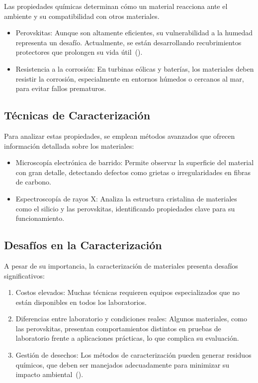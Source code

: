\documentclass[letterpaper, 12pt]{article}
\begin{document}
Las propiedades químicas determinan cómo un material reacciona ante el ambiente
y su compatibilidad con otros materiales.

\begin{itemize}
      \item Perovskitas: Aunque son altamente eficientes, su vulnerabilidad a la humedad
            representa un desafío. Actualmente, se están desarrollando recubrimientos
            protectores que prolongen su vida útil~(\cite{Henriksson2021}).

      \item Resistencia a la corrosión: En turbinas eólicas y baterías, los materiales
            deben resistir la corrosión, especialmente en entornos húmedos o cercanos al
            mar, para evitar fallos prematuros.
\end{itemize}

\subsection{Técnicas de Caracterización}

Para analizar estas propiedades, se emplean métodos avanzados que ofrecen
información detallada sobre los materiales:

\begin{itemize}
      \item Microscopía electrónica de barrido: Permite observar la superficie del material
            con gran detalle, detectando defectos como grietas o irregularidades en fibras
            de carbono.

      \item Espectroscopía de rayos X: Analiza la estructura cristalina de materiales como
            el silicio y las perovskitas, identificando propiedades clave para su
            funcionamiento.
\end{itemize}

\subsection{Desafíos en la Caracterización}

A pesar de su importancia, la caracterización de materiales presenta desafíos
significativos:

\begin{enumerate}
      \item Costos elevados: Muchas técnicas requieren equipos especializados que no están
            disponibles en todos los laboratorios.

      \item Diferencias entre laboratorio y condiciones reales: Algunos materiales, como
            las perovskitas, presentan comportamientos distintos en pruebas de laboratorio
            frente a aplicaciones prácticas, lo que complica su evaluación.

      \item Gestión de desechos: Los métodos de caracterización pueden generar residuos
            químicos, que deben ser manejados adecuadamente para minimizar su impacto
            ambiental~(\cite{Galembeck2019}).
\end{enumerate}
\end{document}
